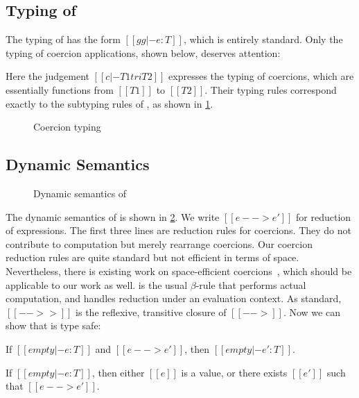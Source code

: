 

\subsection{Typing of \tname}

The typing of \tname has the form $[[gg |- e : T]]$, which is entirely standard. Only the typing of coercion
applications, shown below, deserves attention:
\begin{mathpar}
\end{mathpar}
Here the judgement $[[c |- T1 tri T2]]$ expresses the typing of coercions, which
are essentially functions from $[[T1]]$ to $[[T2]]$. Their typing
rules correspond exactly to the subtyping rules of \namee, as
shown in \cref{fig:co}.

\begin{figure}[t]
  \centering
  \caption{Coercion typing}
  \label{fig:co}
\end{figure}


\subsection{Dynamic Semantics}

\begin{figure}[t]
  \centering
{}
  \caption{Dynamic semantics of \tname}
  \label{fig:coercion_red}
\end{figure}

The dynamic semantics of \tname is shown in \cref{fig:coercion_red}. We write
$[[e --> e']]$ for reduction of expressions. The first three lines are reduction
rules for coercions. They do not contribute to computation but merely rearrange
coercions. Our coercion reduction rules are quite standard but not efficient in
terms of space. Nevertheless, there is existing work on space-efficient
coercions~\citep{Siek_2015, herman2010space}, which should be applicable to our
work as well.  is the usual $\beta$-rule that performs actual
computation, and  handles reduction under an evaluation context. As
standard, $[[-->>]]$ is the reflexive, transitive closure of $[[-->]]$.
Now we can show that \tname is type safe:
\begin{theorem}[Preservation]
  If $[[empty |- e : T]]$ and $[[e --> e']]$, then $[[empty |- e' : T]]$.
\end{theorem}
\begin{theorem}[Progress]
  If $[[empty |- e : T]]$, then either $[[e]]$ is a value, or there exists $[[e']]$ such
  that $[[e --> e']]$.
\end{theorem}


